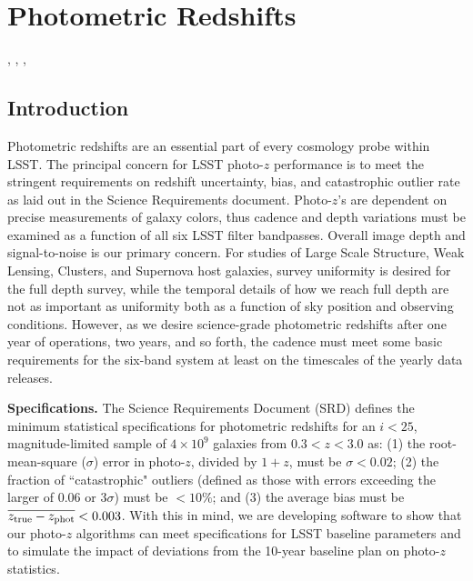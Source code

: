 %
%
%
%
%
%
\clearpage
\section{Photometric Redshifts}
\def\secname{photoz}\label{sec:\secname}

,
,
,

\subsection{Introduction}

Photometric redshifts are an essential part of
every cosmology probe within LSST.  The principal concern for LSST
photo-$z$ performance is to meet the stringent requirements on redshift
uncertainty, bias, and catastrophic outlier rate as laid out in the
Science Requirements document. Photo-$z$'s are dependent on precise
measurements of galaxy colors, thus cadence and depth variations must be
examined as a function of all six LSST filter bandpasses.  Overall image
depth and signal-to-noise is our primary concern. For studies of Large
Scale Structure, Weak Lensing, Clusters, and Supernova host galaxies,
survey uniformity is desired for the full depth survey, while the
temporal details of how we reach full depth are not as important as
uniformity both as a function of sky position and observing conditions.
However, as we desire science-grade photometric redshifts after one year
of operations, two years, and so forth, the cadence must meet some basic
requirements for the six-band system at least on the timescales of the
yearly data releases.


\textbf{Specifications.} The Science Requirements Document (SRD) defines
the minimum statistical specifications for photometric redshifts for an
$i<25$, magnitude-limited sample of $4\times10^9$ galaxies from
$0.3<z<3.0$ as: (1) the root-mean-square ($\sigma$) error in photo-$z$,
divided by $1+z$, must be $\sigma < 0.02$; (2) the fraction of
``catastrophic" outliers (defined as those with errors exceeding the
larger of 0.06 or 3$\sigma$) must be $<10\%$; and (3) the average bias
must be $\overline{z_{\rm true} - z_{\rm phot}} < 0.003$. With this in
mind, we are developing software to show that our photo-$z$ algorithms
can meet specifications for LSST baseline parameters and to simulate the
impact of deviations from the 10-year baseline plan on photo-$z$
statistics.

